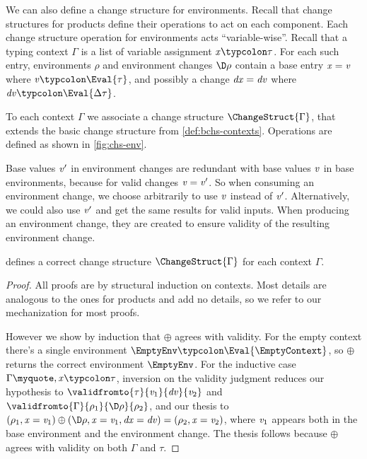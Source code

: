 We can also define a change structure for environments.
Recall that change structures for products define their operations to act on
each component.
Each change structure operation for environments acts ``variable-wise''. Recall
that a typing context \ensuremath{\Gamma} is a list of variable assignment \ensuremath{\Varid{x}\typcolon\tau}. For
each such entry, environments \ensuremath{\rho} and environment changes \ensuremath{\D\rho} contain a
base entry \ensuremath{\Varid{x}\mathrel{=}\Varid{v}} where \ensuremath{\Varid{v}\typcolon\Eval{\tau}}, and possibly a change \ensuremath{\Varid{dx}\mathrel{=}\Varid{dv}} where
\ensuremath{\Varid{dv}\typcolon\Eval{\Delta \tau}}.


\begin{definition}
  \label{def:chs-envs}
  To each context \ensuremath{\Gamma} we associate a change structure
  \ensuremath{\ChangeStruct{\Gamma}}, that extends the basic change structure from \cref{def:bchs-contexts}.
  Operations are defined as shown in \cref{fig:chs-env}.
\end{definition}
Base values \ensuremath{\Varid{v'}} in environment changes are redundant with base values \ensuremath{\Varid{v}} in
base environments, because for valid changes \ensuremath{\Varid{v}\mathrel{=}\Varid{v'}}.
So when consuming an environment change, we choose arbitrarily to use \ensuremath{\Varid{v}} instead
of \ensuremath{\Varid{v'}}. Alternatively, we could also use \ensuremath{\Varid{v'}} and get the same results for
valid inputs.
When producing an environment change, they are created to ensure validity of the
resulting environment change.

\begin{lemma}
   defines a correct change structure \ensuremath{\ChangeStruct{\Gamma}} for each
  context \ensuremath{\Gamma}.
\end{lemma}
\begin{proof}
  All proofs are by structural induction on contexts.
  Most details are analogous to the ones for products and add no
  details, so we refer to our mechanization for most proofs.

  However we show by induction that \ensuremath{\oplus } agrees with validity.
  For the empty context there's a single environment \ensuremath{\EmptyEnv\typcolon\Eval{\EmptyContext}}, so \ensuremath{\oplus } returns the correct environment \ensuremath{\EmptyEnv}.
  For the inductive case \ensuremath{\Gamma\myquote,\Varid{x}\typcolon\tau},
  inversion on the validity judgment reduces our hypothesis to \ensuremath{\validfromto{\tau}{\Varid{v}_{1}}{\Varid{dv}}{\Varid{v}_{2}}} and \ensuremath{\validfromto{\Gamma}{\rho_{1}}{\D\rho}{\rho_{2}}}, and our thesis to \ensuremath{(\rho_{1},\Varid{x}\mathrel{=}\Varid{v}_{1})\oplus (\D\rho,\Varid{x}\mathrel{=}\Varid{v}_{1},\Varid{dx}\mathrel{=}\Varid{dv})\mathrel{=}(\rho_{2},\Varid{x}\mathrel{=}\Varid{v}_{2})}, where \ensuremath{\Varid{v}_{1}} appears both in the base
  environment and the environment change. The thesis follows because \ensuremath{\oplus }
  agrees with validity on both \ensuremath{\Gamma} and \ensuremath{\tau}.
\end{proof}

